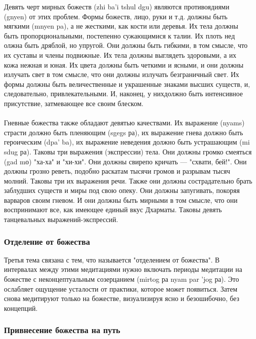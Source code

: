 \begin{siderules}
Девять черт мирных божеств (zhi ba'i tshul dgu) являются противоядиями (gnyen) от этих
проблем. Формы божеств, лицо, руки и т.д. должны быть мягкими (mnyen pa), а не жесткими,
как кости или деревья. Их тела должны быть пропорциональными, постепенно сужающимися
к талии. Их плоть нед олжна быть дряблой, но упругой. Они должны быть гибкими, в том
смысле, что их суставы и члены подвижные. Их тела должны выглядеть здоровыми, а их
кожа нежная и юная. Их цвета должны быть четкими и ясными, и они должны излучать свет
в том смысле, что они должны излучать безграничный свет. Их формы должны быть
величественные и украшенные знаками высших существ, и, следовательно,
привлекательными. И, наконец, у нихдолжно быть интенсивное присутствие, затмевающее
все своим блеском.\\
\\
Гневные божества также обладают девятью качествами. Их выражение (nyams) страсти
должно быть пленяющим (sgegs ра), их выражение гнева должно быть героическим (dpa' ba),
их выражение неведения должно быть устрашающим (mi sdug ра). Таковы три выражения
(экспрессии) тела. Они должны громко смеяться (gad mо) "ха-ха" и "хи-хи". Они должны
свирепо кричать — "схвати, бей!". Они должны грозно реветь, подобно раскатам тысячи
громов и разрывам тысяч молний. Таковы три их выражения речи. Также они должны
сострадательно брать заблудших существ и миры под свою опеку. Они должны запугивать,
покоряя варваров своим гневом. И они должны быть мирными в том смысле, что они
воспринимают все, как имеющее единый вкус Дхарматы. Таковы девять танцевальных
выражений-экспрессий.
\end{siderules}

\subsubsection{Отделение от божества}

Третья тема связана с тем, что называется "отделением от божества". В интервалах
между этими медитациями нужно включать периоды медитации на божестве с
неконцептуальным созерцанием (mirtog ра nyam par 'jog ра). Это ослабляет ощущение
усталости от практики, которое может появиться. Затем снова медитируют только на
божестве, визуализируя ясно и безошибочно, без концепций.\\

\subsubsection{Привнесение божества на путь}

